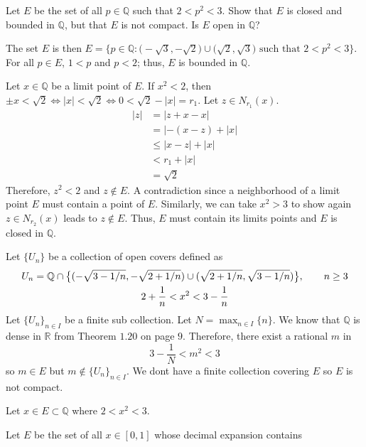\begin{exercise}
  Let \(E\) be the set of all \(p\in\mathbb{Q}\) such that \(2 < p^2 < 3\).
  Show that \(E\) is closed and bounded in \(\mathbb{Q}\), but that \(E\) is
  not compact.
  Is \(E\) open in \(\mathbb{Q}\)?
  \par\smallskip
  The set \(E\) is then
  \(E = \bigl\{p\in\mathbb{Q}\colon\bigl(-\sqrt{3},-\sqrt{2}\bigr)\cup
  \bigl(\sqrt{2},\sqrt{3}\bigr)\text{ such that } 2 < p^2 < 3\bigr\}\).
  For all \(p\in E\), \(1 < p\) and \(p < 2\); thus, \(E\) is bounded in \(\mathbb{Q}\).
  \par\smallskip
  Let \(x\in\mathbb{Q}\) be a limit point of \(E\).
  If \(x^2 < 2\), then \(\pm x < \sqrt{2}\iff\lvert x\rvert < \sqrt{2}\iff 0 < \sqrt{2} - \lvert x\rvert = r_1\).
  Let \(z\in N_{r_1}(x)\).
  \[
  	\begin{aligned}
		\lvert z\rvert &= \lvert z + x - x\rvert\\
		&= \lvert -(x - z) + \lvert x\rvert\\
		&\leq\lvert x - z\rvert + \lvert x\rvert\\
		&< r_1 + \lvert x\rvert\\
		&= \sqrt{2}
	\end{aligned}
  \]
  Therefore, \(z^2 < 2\) and \(z\not\in E\).
  A contradiction since a neighborhood of a limit point \(E\) must contain a point of \(E\).
  Similarly, we can take \(x^2 > 3\) to show again \(z\in N_{r_2}(x)\) leads to \(z\not\in E\).
  Thus, \(E\) must contain its limits points and \(E\) is closed in \(\mathbb{Q}\).
  \par\smallskip
  Let \(\{U_n\}\) be a collection of open covers defined as
  \begin{gather}
  	U_n = \mathbb{Q}\cap\big\{(-\sqrt{3 - 1/n}, -\sqrt{2 + 1/n}) \cup (\sqrt{2 + 1/n}, \sqrt{3 - 1/n})\big\},
	\qquad n\ge 3\notag\\
	2 + \frac{1}{n} < x^2 < 3 - \frac{1}{n}\notag
  \end{gather}
  Let \(\{U_n\}_{n\in I}\) be a finite sub collection.
  Let \(N = \max_{n\in I}\{n\}\).
  We know that \(\mathbb{Q}\) is dense in \(\mathbb{R}\) from Theorem \(1.20\) on page \(9\).
  Therefore, there exist a rational \(m\) in 
  \[
  	3 - \frac{1}{N} < m^2 < 3
  \]
  so \(m\in E\) but \(m\not\in \{U_n\}_{n\in I}\).
  We dont have a finite collection covering \(E\) so \(E\) is not compact.
  \par\smallskip
  Let \(x\in E\subset\mathbb{Q}\) where \(2 < x^2 < 3\).
\item
  Let \(E\) be the set of all \(x\in[0,1]\) whose decimal expansion contains

\end{exercise}
